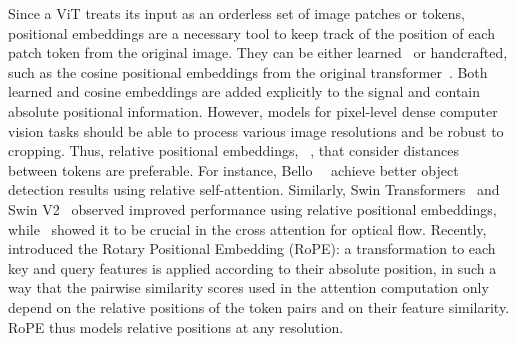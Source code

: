 \documentclass[10pt,twocolumn,letterpaper]{article}
\newcommand{\PAR}[1]{\noindent{\bf{#1.}}}
\begin{document}
\PAR{Positional embeddings} 
Since a ViT treats its input as an orderless set of image patches or tokens, positional embeddings are a necessary tool to keep track of the position of each patch token from the original image.
They can be either learned~\cite{dino,vit} or handcrafted, such as the cosine positional embeddings from the original transformer~\cite{attn}.
Both learned and cosine embeddings are added explicitly to the signal and contain absolute positional information.
However, models for pixel-level dense computer vision tasks should be able to process various image resolutions and be robust to cropping. Thus, relative positional embeddings, \eg~\cite{ShawNAACL18RelPos}, that consider distances between tokens are preferable. 
For instance, Bello~\etal~\cite{BelloICCV19AttentionAugmentedCNN} 
achieve better object detection results
using relative self-attention.
Similarly, 
Swin Transformers~\cite{swin} and Swin V2~\cite{swinv2} observed improved performance using relative positional embeddings, while~\cite{craft} showed it to be crucial in the cross attention for optical flow. 
Recently, \cite{rope} introduced the Rotary Positional Embedding (RoPE): 
a transformation to each key and query features is applied according to their absolute position, in such a way that the pairwise similarity scores used in the attention computation only depend on the relative positions of the token pairs and on their feature similarity. 
RoPE thus models relative positions 
at any resolution. 
\end{document}
